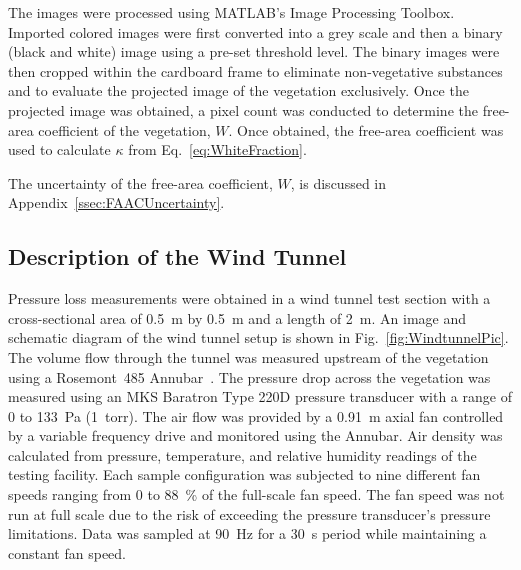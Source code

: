 \documentclass[12pt]{article}
\begin{document}
The images were processed using MATLAB's Image Processing Toolbox. Imported colored images were first converted into a grey scale and then a binary (black and white) image using a pre-set threshold level. The binary images were then cropped within the cardboard frame to eliminate non-vegetative substances and to evaluate the projected image of the vegetation exclusively. Once the projected image was obtained, a pixel count was conducted to determine the free-area coefficient of the vegetation, $W$. Once obtained, the free-area coefficient was used to calculate $\kappa$ from Eq.~\ref{eq:WhiteFraction}.

The uncertainty of the free-area coefficient, $W$, is discussed in Appendix~\ref{ssec:FAACUncertainty}.

\subsection{Description of the Wind Tunnel}
\label{ssec:headingscap}

Pressure loss measurements were obtained in a wind tunnel test section with a cross-sectional area of 0.5~\si{m} by 0.5~\si{m} and a length of 2~\si{m}. An image and schematic diagram of the wind tunnel setup is shown in Fig.~\ref{fig:WindtunnelPic}. The volume flow through the tunnel was measured upstream of the vegetation using a Rosemont~485 Annubar~\cite{Annubar}. The pressure drop across the vegetation was measured using an MKS Baratron Type 220D pressure transducer with a range of 0 to 133~Pa (1~torr). The air flow was provided by a 0.91~m axial fan controlled by a variable frequency drive and monitored using the Annubar. Air density was calculated from pressure, temperature, and relative humidity readings of the testing facility. Each sample configuration was subjected to nine different fan speeds ranging from 0 to 88~\% of the full-scale fan speed. The fan speed was not run at full scale due to the risk of exceeding the pressure transducer's pressure limitations. Data was sampled at 90~\si{Hz} for a 30~\si{s} period while maintaining a constant fan speed.
\end{document}
